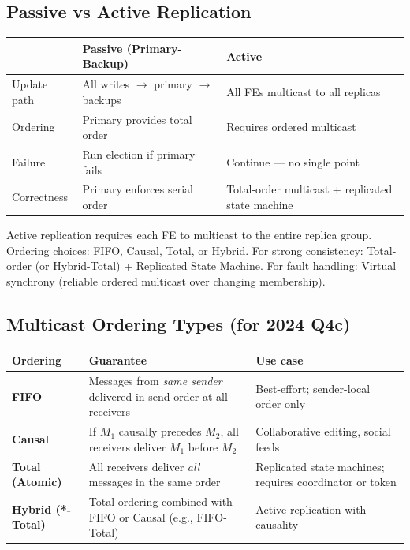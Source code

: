 \documentclass[12pt,a4paper]{article}
\begin{document}
\subsection{Passive vs Active Replication}
\begin{center}
\renewcommand{\arraystretch}{1.25}
\begin{tabular}{lll}
\toprule
& \textbf{Passive (Primary-Backup)} & \textbf{Active} \\
\midrule
Update path & All writes $\to$ primary $\to$ backups & All FEs multicast to all replicas \\
Ordering & Primary provides total order & Requires ordered multicast \\
Failure & Run election if primary fails & Continue — no single point \\
Correctness & Primary enforces serial order & Total-order multicast + replicated state machine \\
\bottomrule
\end{tabular}
\end{center}

Active replication requires each FE to multicast to the entire replica group.
Ordering choices: FIFO, Causal, Total, or Hybrid.
For strong consistency: Total-order (or Hybrid-Total) + Replicated State Machine.
For fault handling: Virtual synchrony (reliable ordered multicast over changing membership).

\subsection{Multicast Ordering Types (for 2024 Q4c)}
\begin{center}
\renewcommand{\arraystretch}{1.3}
\begin{tabular}{lp{6cm}p{5cm}}
\toprule
\textbf{Ordering} & \textbf{Guarantee} & \textbf{Use case} \\
\midrule
\textbf{FIFO} & Messages from \emph{same sender} delivered in send order at all receivers & Best-effort; sender-local order only \\
\textbf{Causal} & If $M_1$ causally precedes $M_2$, all receivers deliver $M_1$ before $M_2$ & Collaborative editing, social feeds \\
\textbf{Total (Atomic)} & All receivers deliver \emph{all} messages in the same order & Replicated state machines; requires coordinator or token \\
\textbf{Hybrid (*-Total)} & Total ordering combined with FIFO or Causal (e.g., FIFO-Total) & Active replication with causality \\
\bottomrule
\end{tabular}
\end{center}
\end{document}
